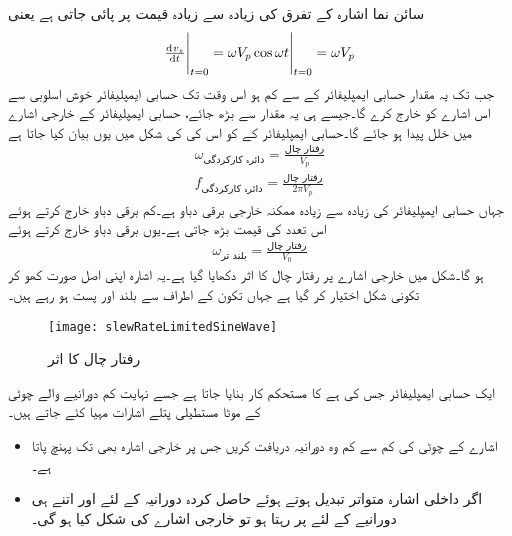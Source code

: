 سائن نما  اشارہ  کے تفرق کی زیادہ سے زیادہ قیمت  پر پائی جاتی ہے یعنی
\begin{align*}
\eval{\od{v_s}{t}}_{t=0}=\eval{\omega V_p \cos \omega t}_{t=0}=\omega V_p
\end{align*}
جب تک یہ مقدار حسابی ایمپلیفائر کے  سے کم ہو اس وقت تک حسابی ایمپلیفائر خوش اسلوبی سے اس اشارے کو خارج کرے گا۔جیسے ہی یہ مقدار  سے بڑھ جائے، حسابی ایمپلیفائر کے خارجی اشارے میں خلل پیدا ہو جائے گا۔حسابی ایمپلیفائر کے  کو اس کی  کی شکل میں یوں بیان کیا جاتا ہے
\begin{align}
\omega_{\textrm{دائرہ کارکردگی}}=\frac{\textrm{رفتار چال}}{V_p}\\
f_{\textrm{دائرہ کارکردگی}}=\frac{\textrm{رفتار چال}}{2 \pi V_p}
\end{align}   
جہاں  حسابی ایمپلیفائر کی زیادہ سے زیادہ ممکنہ  خارجی برقی دباو ہے۔کم برقی دباو خارج کرتے ہوئے اس تعدد کی قیمت بڑھ جاتی ہے۔یوں  برقی دباو خارج کرتے ہوئے
 \begin{align}
\omega_{\textrm{بلند تر}}=\frac{\textrm{رفتار چال}}{V_0}
\end{align}   
ہو گا۔شکل  میں خارجی اشارے پر رفتار چال کا اثر دکھایا گیا ہے۔یہ اشارہ  اپنی اصل صورت کھو کر تکونی شکل اختیار کر گیا ہے جہاں تکون کے اطراف  سے بلند اور پست ہو رہے ہیں۔
\begin{figure}
\centering
\texttt{[image: slewRateLimitedSineWave]}
\caption{رفتار چال کا اثر}
\label{شکل_حسابی_رفتار_چال_محدود_اشارہ}
\end{figure}
ایک حسابی ایمپلیفائر جس کی    ہے  کا مستحکم کار بنایا جاتا ہے جسے نہایت کم دورانیے والے  چوٹی کے موٹا {مستطیلی پتلے اشارات}  مہیا کئے جاتے ہیں۔
\begin{itemize}
\item
اشارے کے چوٹی کی کم سے کم وہ دورانیہ  دریافت کریں جس پر خارجی اشارہ بھی  تک پہنچ پاتا ہے۔
\item
اگر داخلی اشارہ متواتر تبدیل ہوتے ہوئے حاصل کردہ دورانیہ  کے لئے  اور اتنے ہی  دورانیے کے لئے  پر رہتا ہو تو خارجی اشارے کی شکل کیا ہو گی۔
\end{itemize}


